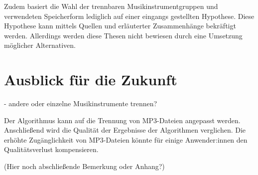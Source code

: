 \par

Zudem basiert die Wahl der trennbaren Musikinstrumentgruppen und verwendeten Speicherform lediglich auf einer eingangs gestellten Hypothese.
Diese Hypothese kann mittels Quellen und erläuterter Zusammenhänge bekräftigt werden.
Allerdings werden diese Thesen nicht bewiesen durch eine Umsetzung möglicher Alternativen.

%
\section{Ausblick für die Zukunft}
%

 - andere oder einzelne Musikinstrumente trennen?

Der Algorithmus kann auf die Trennung von MP3-Dateien angepasst werden.
Anschließend wird die Qualität der Ergebnisse der Algorithmen verglichen.
Die erhöhte Zugänglichkeit von MP3-Dateien könnte für einige Anwender:innen den Qualitätsverlust kompensieren.

(Hier noch abschließende Bemerkung oder Anhang?)